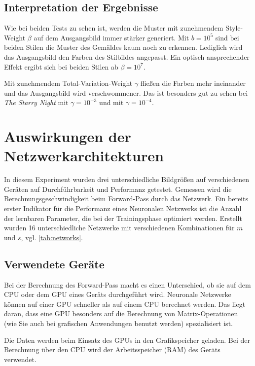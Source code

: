 \pagebreak

\subsection{Interpretation der Ergebnisse}

Wie bei beiden Tests zu sehen ist, werden die Muster mit zunehmendem Style-Weight $ \beta $ auf dem Ausgangsbild immer stärker generiert. Mit $ b = 10^{5} $ sind bei beiden Stilen die Muster des Gemäldes kaum noch zu erkennen. Lediglich wird das Ausgangsbild den Farben des Stilbildes angepasst. Ein optisch ansprechender Effekt ergibt sich bei beiden Stilen ab $ \beta = 10^{7} $. 

Mit zunehmendem Total-Variation-Weight $ \gamma $ fließen die Farben mehr ineinander und das Ausgangsbild wird verschwommener. Das ist besonders gut zu sehen bei \textit{The Starry Night} mit $ \gamma = 10^{-3} $ und  mit $ \gamma = 10^{-4} $.


\section{Auswirkungen der Netzwerkarchitekturen}

In diesem Experiment wurden drei unterschiedliche Bildgrößen auf verschiedenen Geräten auf Durchführbarkeit und Performanz getestet.
Gemessen wird die Berechnungsgeschwindigkeit beim Forward-Pass durch das Netzwerk. Ein bereits erster Indikator für die Performanz eines Neuronalen Netzwerks ist die Anzahl der lernbaren Parameter, die bei der Trainingsphase optimiert werden. Erstellt wurden 16 unterschiedliche Netzwerke mit verschiedenen Kombinationen für $ m $ und $ s $, vgl. \ref{tab:networks}. 

\subsection{Verwendete Geräte}

Bei der Berechnung des Forward-Pass macht es einen Unterschied, ob sie auf dem CPU oder dem GPU eines Geräts durchgeführt wird. Neuronale Netzwerke können auf einer GPU schneller als auf einem CPU berechnet werden. Das liegt daran, dass eine GPU besonders auf die Berechnung von Matrix-Operationen (wie Sie auch bei grafischen Anwendungen benutzt werden) spezialisiert ist.

Die Daten werden beim Einsatz des GPUs in den Grafikspeicher geladen. Bei der Berechnung über den CPU wird der Arbeitsspeicher (RAM) des Geräts verwendet.

